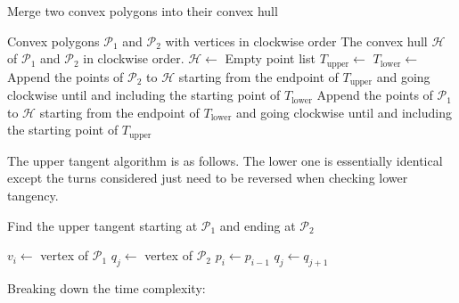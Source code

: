 \documentclass{eeleyes}
\begin{document}
\begin{algorithm}[H]
    \caption{Merge two convex polygons into their convex hull}
    \begin{algorithmic}[1]
        \Input Convex polygons $\mathcal{P}_1$ and $\mathcal{P}_2$ with vertices in clockwise order
        \Output The convex hull $\mathcal{H}$ of $\mathcal{P}_1$ and $\mathcal{P}_2$ in clockwise order.
            \State $\mathcal H \gets $ Empty point list
            \State $T_{\text{upper}} \gets$ 
            \State $T_{\text{lower}} \gets$ 
            \State Append the points of $\mathcal{P}_2$ to $\mathcal{H}$ starting from the endpoint of $T_\text{upper}$ and going clockwise until and including the starting point of $T_\text{lower}$
            \State Append the points of $\mathcal{P}_1$ to $\mathcal{H}$ starting from the endpoint of $T_\text{lower}$ and going clockwise until and including the starting point of $T_\text{upper}$
            \State {}
        \EndProcedure
    \end{algorithmic}
\end{algorithm}

\noindent
The upper tangent algorithm is as follows. The lower one is essentially identical except the turns considered just need to be reversed when checking lower tangency.

\begin{algorithm}[H]
    \caption{Find the upper tangent starting at $\mathcal{P}_1$ and ending at $\mathcal{P}_2$}
\begin{algorithmic}[1]
        \State $v_i \gets $ vertex of $\mathcal{P}_1$
        \State $q_j \gets $ vertex of $\mathcal{P}_2$
                \State $p_i \gets p_{i-1}$ 
            \EndWhile
                \State $q_j \gets q_{j+1}$ 
            \EndWhile
        \EndWhile
    \EndProcedure
\end{algorithmic}
\end{algorithm}

\noindent
Breaking down the time complexity:
\end{document}

